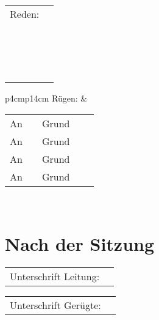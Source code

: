 \documentclass{sasbase}
\begin{document}
\begin{tabular}{p{4cm}p{14cm}}
    Reden: & \dotfill \\
    & \dotfill \\
    & \dotfill \\
    & \dotfill \\
    & \dotfill \\
    & \dotfill \\
    & \dotfill \\
    & \dotfill \\
    & \dotfill \\
    & \dotfill \\
    & \dotfill \\
    & \dotfill \\
    & \dotfill \\
    & \dotfill \\
    & \dotfill \\
    & \dotfill \\
    & \dotfill \\
\end{tabular}

\vspace{3mm}
\begin{tabular}{p{4cm}p{14cm}}
    R\"{u}gen: &
    \begin{tabular}[t]{p{0.5cm}p{5cm}p{1cm}p{0.5cm}p{5cm}}
        An & \dotfill & Grund & \dotfill  \\
        An & \dotfill & Grund & \dotfill  \\
        An & \dotfill & Grund & \dotfill  \\
        An & \dotfill & Grund & \dotfill  \\
    \end{tabular}
    \\
\end{tabular}

\vspace*{-5mm}
\section{Nach der Sitzung}
\vspace*{5mm}

\begin{tabular}{p{4cm}p{14cm}}
    Unterschrift Leitung: & \dotfill \\
\end{tabular}

\begin{tabular}{p{4cm}p{14cm}}
    Unterschrift Ger\"{u}gte: & \dotfill \\
\end{tabular}
\end{document}
